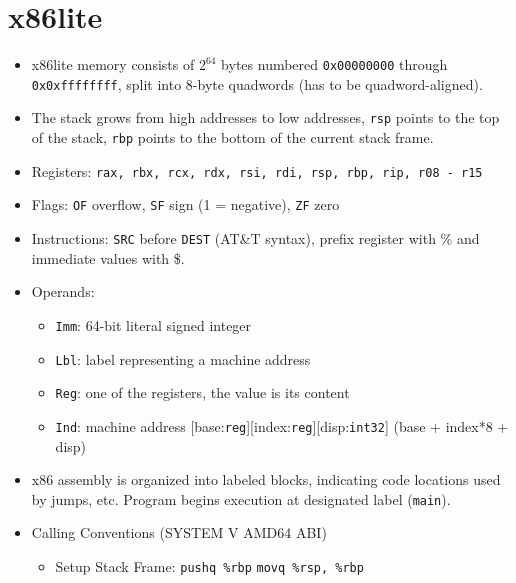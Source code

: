 \section*{x86lite}

\begin{itemize}
	\item x86lite memory consists of $2^{64}$ bytes numbered \texttt{0x00000000} through \texttt{0x0xffffffff}, split into 8-byte quadwords (has to be quadword-aligned).
	
	\item The stack grows from high addresses to low addresses, \texttt{rsp} points to the top of the stack, \texttt{rbp} points to the bottom of the current stack frame.
	
	\item Registers: \texttt{rax, rbx, rcx, rdx, rsi, rdi, rsp, rbp, rip, r08 - r15}
	
	\item Flags: \texttt{OF} overflow, \texttt{SF} sign (1 = negative), \texttt{ZF} zero
	
	\item Instructions: \texttt{SRC} before \texttt{DEST} (AT\&T syntax), prefix register with \% and immediate values with \$.
	
	\item Operands:
	\begin{itemize}
		\item \texttt{Imm}: 64-bit literal signed integer
		\item \texttt{Lbl}: label representing a machine address
		\item \texttt{Reg}: one of the registers, the value is its content
		\item \texttt{Ind}: machine address [base:\texttt{reg}][index:\texttt{reg}][disp:\texttt{int32}] (base + index*8 + disp)
	\end{itemize}
	
	\item x86 assembly is organized into labeled blocks, indicating code locations used by jumps, etc. Program begins execution at designated label (\texttt{main}).
	
	\item Calling Conventions (SYSTEM V AMD64 ABI)
	\begin{itemize}
		\item Setup Stack Frame: \newline
			\texttt{pushq \%rbp} \newline 
			\texttt{movq \%rsp, \%rbp}
		

\end{itemize}
\end{itemize}
